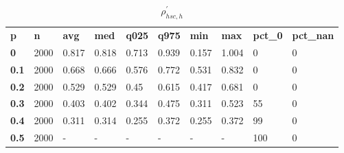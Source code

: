\begin{table}[h]
 \centering 
\footnotesize
\caption{$\rho_{hsc,h}^\prime $}
\label{tab:alphahsch}
\begin{tabular}[h]{| l l l l l l l l l l|
    } \hline
\textbf{ p} & \textbf{ n} & \textbf{ avg} & \textbf{ med} & \textbf{ q025} & \textbf{ q975} & \textbf{ min} & \textbf{ max} & \textbf{ pct\_0} & \textbf{ pct\_nan}
           \\
  \textbf{  0} & 2000 & 0.817 & 0.818 & 0.713 & 0.939 & 0.157 & 1.004 &   0 & 0
           \\
  \textbf{0.1} & 2000 & 0.668 & 0.666 & 0.576 & 0.772 & 0.531 & 0.832 &   0 & 0
           \\
  \textbf{0.2} & 2000 & 0.529 & 0.529 &  0.45 & 0.615 & 0.417 & 0.681 &   0 & 0
           \\
  \textbf{0.3} & 2000 & 0.403 & 0.402 & 0.344 & 0.475 & 0.311 & 0.523 &  55 & 0
           \\
  \textbf{0.4} & 2000 & 0.311 & 0.314 & 0.255 & 0.372 & 0.255 & 0.372 &  99 & 0
           \\
  \textbf{0.5} & 2000 & - & - & - & - & - & - & 100 & 0
           \\
 \hline \end{tabular}
 \end{table}
